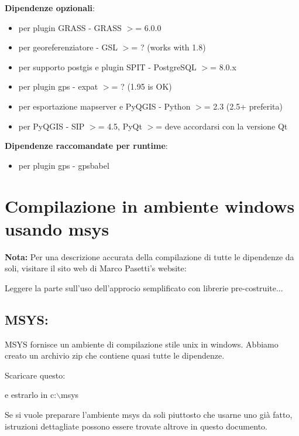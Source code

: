\textbf{Dipendenze opzionali}:

\begin{itemize}
\item per plugin GRASS - GRASS $>$= 6.0.0
\item per georeferenziatore - GSL $>$= ? (works with 1.8)
\item per supporto postgis e plugin SPIT - PostgreSQL $>$= 8.0.x
\item per plugin gps - expat $>$= ? (1.95 is OK)
\item per esportazione mapserver e PyQGIS - Python $>$= 2.3 (2.5+ preferita)
\item per PyQGIS - SIP $>$= 4.5, PyQt $>$= deve accordarsi con la versione Qt
\end{itemize}

\textbf{Dipendenze raccomandate per runtime}:

\begin{itemize}
\item per plugin gps - gpsbabel
\end{itemize}

\section{Compilazione in ambiente windows usando msys}\label{sec:install_windows}
\textbf{Nota:} Per una descrizione accurata della compilazione di tutte le dipendenze da soli, visitare il sito web di Marco Pasetti's website:


Leggere la parte sull'uso dell'approcio semplificato con librerie pre-costruite...

\subsection{MSYS:}
MSYS fornisce un ambiente di compilazione stile unix in windows. Abbiamo creato un archivio zip che contiene quasi tutte le dipendenze.

Scaricare questo: 


e estrarlo in c:$\backslash$msys

Se si vuole preparare l'ambiente msys da soli piuttosto che usarne uno già fatto, istruzioni dettagliate possono essere trovate altrove in questo documento.

